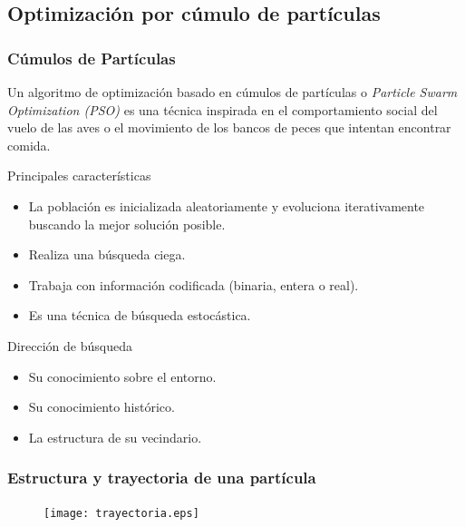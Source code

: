 \documentclass[10pt,compress]{beamer}
\begin{document}
\subsection{Optimizaci\'on por c\'umulo de part\'iculas}
\begin{frame}
	\frametitle{C\'umulos de Part\'iculas}
Un algoritmo de optimizaci\'on basado en c\'umulos de part\'iculas o \textit{Particle Swarm Optimization (PSO)} es una t\'ecnica inspirada en el 
  comportamiento social del vuelo de las aves o el movimiento de los bancos de peces que intentan encontrar comida.
	
	\begin{block}{Principales caracter\'isticas}
	    \begin{itemize}
   \item La poblaci\'on es inicializada aleatoriamente y evoluciona iterativamente buscando la mejor soluci\'on posible.
   \item Realiza una b\'usqueda ciega.
   \item Trabaja con informaci\'on codificada (binaria, entera o real).
   \item Es una t\'ecnica de b\'usqueda estoc\'astica.
  \end{itemize}
	\end{block}
	
	\begin{block}{Direcci\'on de b\'usqueda}  
  \begin{itemize}
   \item Su conocimiento sobre el entorno. 
   \item Su conocimiento hist\'orico.
   \item La estructura de su vecindario.
  \end{itemize} 
	\end{block}
\end{frame}

\begin{frame}
	\frametitle{Estructura y trayectoria de una part\'icula}
	 \begin{figure}
	\centering
	\texttt{[image: trayectoria.eps]}
     
      \end{figure}						
\end{frame}
\end{document}
